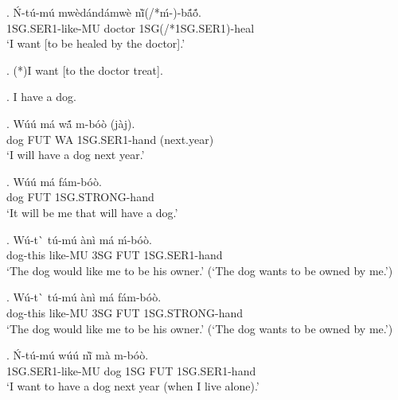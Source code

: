 \documentclass{assets/fieldnotes}
\begin{document}
\exg. \'{N}-t\'{u}-m\'{u} mw\`{e}d\'{a}nd\'{a}mw\`{e} nĩ̀(/*\'{m}-)-bã́ṍ.\\
1SG.SER1-like-MU doctor 1SG(/*1SG.SER1)-heal \\
`I want [to be healed by the doctor].'


\ex. (*)I want [to the doctor treat].  

 \newline


\ex. I have a dog. 

\exg. W\'{u}\'{u} m\'{a} wã́ m-b\'{o}\`{o} (j\`{a}j). \\
dog FUT WA 1SG.SER1-hand (next.year) \\
`I will have a dog next year.' 

\exg. W\'{u}\'{u} m\'{a} f\'{a}m-b\'{o}\`{o}. \\
dog FUT 1SG.STRONG-hand \\
`It will be me that will have a dog.' 

\exg. W\'{u}-t\`{} t\'{u}-m\'{u} \`{a}n\`{i} m\'{a} \'{m}-b\'{o}\`{o}. \\
dog-this like-MU 3SG FUT 1SG.SER1-hand \\
`The dog would like me to be his owner.' 
(`The dog wants to be owned by me.')

\exg. W\'{u}-t\`{} t\'{u}-m\'{u} \`{a}n\`{i} m\'{a} f\'{a}m-b\'{o}\`{o}. \\
dog-this like-MU 3SG FUT 1SG.STRONG-hand \\
`The dog would like me to be his owner.'
(`The dog wants to be owned by me.')

\exg. \'{N}-t\'{u}-m\'{u} w\'{u}\'{u} nĩ̀ m\`{a} m-b\'{o}\`{o}. \\
1SG.SER1-like-MU dog 1SG FUT 1SG.SER1-hand \\
`I want to have a dog next year (when I live alone).' 
\end{document}
